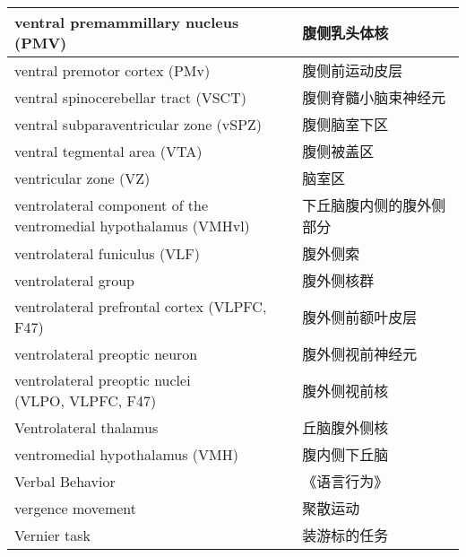 \begin{longtable}{lll}
	\midrule
	ventral premammillary nucleus (PMV)  && 腹侧乳头体核  \\
	
	\midrule
	ventral premotor cortex (PMv)   && 腹侧前运动皮层  \\
	
	\midrule
	ventral spinocerebellar tract (VSCT)   && 腹侧脊髓小脑束神经元  \\
	
	\midrule
	ventral subparaventricular zone (vSPZ)  && 腹侧脑室下区  \\
	
	\midrule
	ventral tegmental area (VTA)   && 腹侧被盖区  \\
	
	\midrule
	ventricular zone (VZ)   && 脑室区  \\
	
	\midrule
	\makecell[l]{ventrolateral component of the \\ventromedial hypothalamus (VMHvl)}  && 下丘脑腹内侧的腹外侧部分  \\
	
	\midrule
	ventrolateral funiculus (VLF)   && 腹外侧索  \\
	
	\midrule
	ventrolateral group   && 腹外侧核群  \\
	
	\midrule
	ventrolateral prefrontal cortex (VLPFC, F47)   && 腹外侧前额叶皮层  \\
	
	\midrule
	ventrolateral preoptic neuron   && 腹外侧视前神经元  \\
	
	\midrule
	\makecell[l]{ventrolateral preoptic nuclei\\ (VLPO, VLPFC, F47)}  && 腹外侧视前核  \\
	
	\midrule
	Ventrolateral thalamus   && 丘脑腹外侧核  \\
	
	\midrule
	ventromedial hypothalamus (VMH)  && 腹内侧下丘脑  \\
	
	\midrule
	Verbal Behavior   && 《语言行为》  \\
	
	\midrule
	vergence movement   && 聚散运动  \\
	
	\midrule
	Vernier task   && 装游标的任务  \\
	

\end{longtable}
